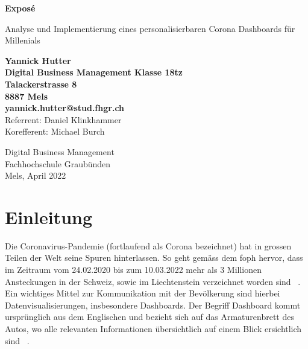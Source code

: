 \documentclass[12pt, oneside]{article}
\begin{document}
\begin{titlepage}
	\begin{center}
		\Huge
		\textbf{Exposé}
		
		\vspace{0.5cm}
		\LARGE
		Analyse und Implementierung eines personalisierbaren Corona Dashboards für Millenials
		
		\vspace{1.5cm}
		\normalsize
		\textbf{Yannick Hutter}\\
		\textbf{Digital Business Management Klasse 18tz}\\
		\textbf{Talackerstrasse 8}\\
		\textbf{8887 Mels}\\
		\textbf{yannick.hutter@stud.fhgr.ch}\\

		
		\vfill
		Referrent: Daniel Klinkhammer\\
		Korefferent: Michael Burch\\
		
		\vspace{0.8cm}
		
		
		Digital Business Management\\
		Fachhochschule Graubünden\\
		Mels, April 2022
	\end{center}
\end{titlepage}



\tableofcontents
\listoffigures
\listoftables

\clearpage
\printglossaries



\clearpage
{}
\setcounter{page}{3}

\section{Einleitung}
Die Coronavirus-Pandemie (fortlaufend als Corona bezeichnet) hat in grossen Teilen der Welt seine Spuren hinterlassen. So geht gemäss dem \Gls{foph} hervor, dass im Zeitraum vom 24.02.2020 bis zum 10.03.2022 mehr als 3 Millionen Ansteckungen in der Schweiz, sowie im Liechtenstein verzeichnet worden sind ~\citep{FOPH.13.03.2022}. Ein wichtiges Mittel zur Kommunikation mit der Bevölkerung sind hierbei Datenvisualisierungen, insbesondere Dashboards.
Der Begriff Dashboard kommt ursprünglich aus dem Englischen und bezieht sich auf das Armaturenbrett des Autos, wo alle relevanten Informationen übersichtlich auf einem Blick ersichtlich sind ~\citep{Duden.18.04.2022}.\\
\end{document}

